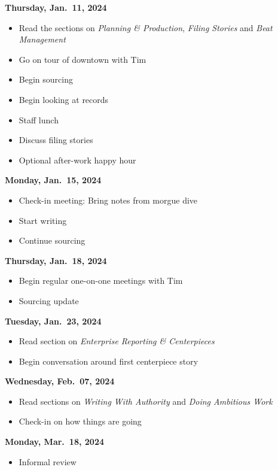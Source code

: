 \documentclass[
  11pt,
  american,
  letterpaperpaper,
  extrafontsizes,onecolumn,openright
  ]{memoir}
\providecommand{\tightlist}{%
  \setlength{\itemsep}{0pt}\setlength{\parskip}{0pt}}
\begin{document}
\textbf{Thursday, Jan.~11, 2024}

\begin{itemize}
\item
  Read the sections on \emph{Planning \& Production}, \emph{Filing Stories} and \emph{Beat Management}
\item
  Go on tour of downtown with Tim
\item
  Begin sourcing
\item
  Begin looking at records
\item
  Staff lunch
\item
  Discuss filing stories
\item
  Optional after-work happy hour
\end{itemize}

\textbf{Monday, Jan.~15, 2024}

\begin{itemize}
\item
  Check-in meeting: Bring notes from morgue dive
\item
  Start writing
\item
  Continue sourcing
\end{itemize}

\textbf{Thursday, Jan.~18, 2024}

\begin{itemize}
\tightlist
\item
  Begin regular one-on-one meetings with Tim
\item
  Sourcing update
\end{itemize}

\textbf{Tuesday, Jan.~23, 2024}

\begin{itemize}
\tightlist
\item
  Read section on \emph{Enterprise Reporting \& Centerpieces}
\item
  Begin conversation around first centerpiece story
\end{itemize}

\textbf{Wednesday, Feb.~07, 2024}

\begin{itemize}
\tightlist
\item
  Read sections on \emph{Writing With Authority} and \emph{Doing Ambitious Work}
\item
  Check-in on how things are going
\end{itemize}

\textbf{Monday, Mar.~18, 2024}

\begin{itemize}
\tightlist
\item
  Informal review
\end{itemize}
\end{document}
